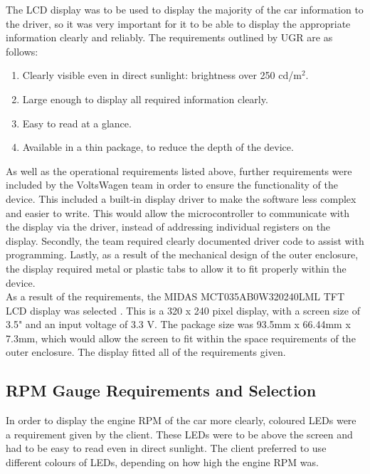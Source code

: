 \documentclass[a4paper,12pt]{article}
\begin{document}
The LCD display was to be used to display the majority of the car information to the driver, so it was very important for it to be able to display the appropriate information clearly and reliably. The requirements outlined by UGR are as follows:

\begin{enumerate}
  \item Clearly visible even in direct sunlight: brightness over 250 cd/$\textrm{m}^2$.
  \item Large enough to display all required information clearly.
  \item Easy to read at a glance.
  \item Available in a thin package, to reduce the depth of the device.
\end{enumerate}

As well as the operational requirements listed above, further requirements were included by the VoltsWagen team in order to ensure the functionality of the device. This included a built-in display driver to make the software less complex and easier to write. This would allow the microcontroller to communicate with the display via the driver, instead of addressing individual registers on the display. Secondly, the team required clearly documented driver code to assist with programming. Lastly, as a result of the mechanical design of the outer enclosure, the display required metal or plastic tabs to allow it to fit properly within the device. \\

As a result of the requirements, the MIDAS MCT035AB0W320240LML TFT LCD display was selected \cite{display_datasheet}. This is a 320 x 240 pixel display, with a screen size of 3.5" and an input voltage of 3.3 V. The package size was 93.5mm x 66.44mm x 7.3mm, which would allow the screen to fit within the space requirements of the outer enclosure. The display fitted all of the requirements given.

\subsection{RPM Gauge Requirements and Selection}
\label{sec:LEDs}

In order to display the engine RPM of the car more clearly, coloured LEDs were a requirement given by the client. These LEDs were to be above the screen and had to be easy to read even in direct sunlight. The client preferred to use different colours of LEDs, depending on how high the engine RPM was. \\
\end{document}
